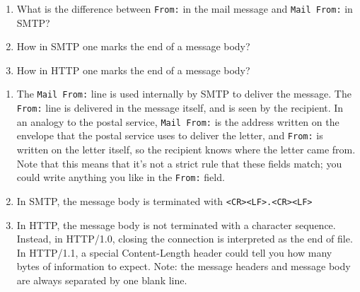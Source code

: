 \documentclass{report}
\begin{document}
\begin{problem}
	\begin{enumerate}
		
		\item What is the difference between \texttt{From:} in the mail message and \texttt{Mail From:} in SMTP? 
		
		\item How in SMTP one marks the end of a message body?
		
		\item How in HTTP one marks the end of a message body?
		
	\end{enumerate}
	
	\begin{answer}{18em}
    \begin{enumerate}
      \item The \texttt{Mail From:} line is used internally by SMTP to deliver
            the message. The \texttt{From:} line is delivered in the message
            itself, and is seen by the recipient. In an analogy to the postal
            service, \texttt{Mail From:} is the address written on the envelope
            that the postal service uses to deliver the letter, and
            \texttt{From:} is written on the letter itself, so the recipient
            knows where the letter came from. Note that this means that it's
            not a strict rule that these fields match; you could write anything
            you like in the \texttt{From:} field.
      \item In SMTP, the message body is terminated with
            \texttt{<CR><LF>.<CR><LF>}
      \item In HTTP, the message body is not terminated with a character
            sequence. Instead, in HTTP/1.0, closing the connection is
            interpreted as the end of file. In HTTP/1.1, a special
            Content-Length header could tell you how many bytes of information
            to expect. Note: the message headers and message body are always
            separated by one blank line.
    \end{enumerate}
	\end{answer}
	
\end{problem}
\end{document}
